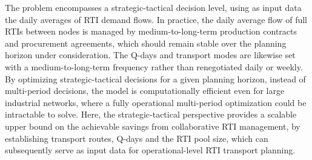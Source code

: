 The problem encompasses a strategic-tactical decision level, using as input data the daily averages of RTI demand flows. In practice, the daily average flow of full RTIs between nodes is managed by medium-to-long-term production contracts and procurement agreements, which should remain stable over the planning horizon under consideration. The Q-days and transport modes are likewise set with a medium-to-long-term frequency rather than renegotiated daily or weekly. By optimizing strategic-tactical decisions for a given planning horizon, instead of multi-period decisions, the model is computationally efficient even for large industrial networks, where a fully operational multi-period optimization could be intractable to solve. Here, the strategic-tactical perspective provides a scalable upper bound on the achievable savings from collaborative RTI management, by establishing transport routes, Q-days and the RTI pool size, which can subsequently serve as input data for operational-level RTI transport planning.
